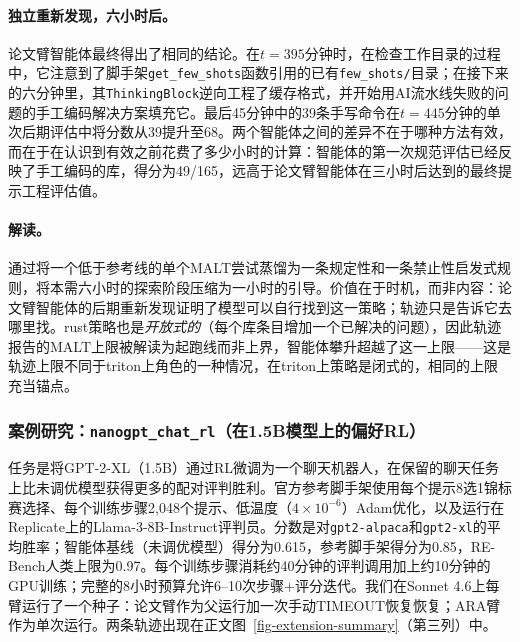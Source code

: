 \paragraph{独立重新发现，六小时后。}
论文臂智能体最终得出了相同的结论。在$t = 395$分钟时，在检查工作目录的过程中，它注意到了脚手架\texttt{get\_few\_shots}函数引用的已有\texttt{few\_shots/}目录；在接下来的六分钟里，其\texttt{ThinkingBlock}逆向工程了缓存格式，并开始用AI流水线失败的问题的手工编码解决方案填充它。最后45分钟中的39条手写命令在$t = 445$分钟的单次后期评估中将分数从39提升至68。两个智能体之间的差异不在于哪种方法有效，而在于在认识到有效之前花费了多少小时的计算：\ara{}智能体的第一次规范评估已经反映了手工编码的库，得分为49/165，远高于论文臂智能体在三小时后达到的最终提示工程评估值。

\paragraph{解读。}
\ara{}通过将一个低于参考线的单个MALT尝试蒸馏为一条规定性和一条禁止性启发式规则，将本需六小时的探索阶段压缩为一小时的引导。价值在于时机，而非内容：论文臂智能体的后期重新发现证明了模型可以自行找到这一策略；轨迹只是告诉它去哪里找。rust策略也是\emph{开放式的}（每个库条目增加一个已解决的问题），因此轨迹报告的MALT上限被解读为起跑线而非上界，\ara{}智能体攀升超越了这一上限——这是轨迹上限不同于triton上角色的一种情况，在triton上策略是闭式的，相同的上限充当锚点。

\subsubsection{案例研究：\texttt{nanogpt\_chat\_rl}（在1.5B模型上的偏好RL）}
\label{sec-eval-extension-nanogpt}

任务是将GPT-2-XL（1.5B）通过RL微调为一个聊天机器人，在保留的聊天任务上比未调优模型获得更多的配对评判胜利。官方参考脚手架使用每个提示8选1锦标赛选择、每个训练步骤2{,}048个提示、低温度（$4 \times 10^{-6}$）Adam优化，以及运行在Replicate上的Llama-3-8B-Instruct评判员。分数是对\texttt{gpt2-alpaca}和\texttt{gpt2-xl}的平均胜率；智能体基线（未调优模型）得分为0.615，参考脚手架得分为0.85，RE-Bench人类上限为0.97。每个训练步骤消耗约40分钟的评判调用加上约10分钟的GPU训练；完整的8小时预算允许6--10次步骤+评分迭代。我们在Sonnet 4.6上每臂运行了一个种子：论文臂作为父运行加一次手动TIMEOUT恢复恢复；ARA臂作为单次运行。两条轨迹出现在正文图~\ref{fig-extension-summary}（第三列）中。

